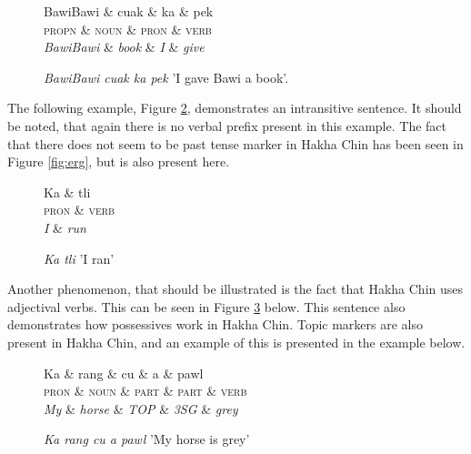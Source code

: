 \documentclass[10pt, a4paper]{article}
\begin{document}
\begin{figure}[h]
\centering
 \begin{dependency} 
   \begin{deptext}[column sep=0.2cm]
     BawiBawi \& cuak \& ka \& pek\\
     \textsc{propn} \& \textsc{noun} \& \textsc{pron} \& \textsc{verb}\\
     \emph{BawiBawi} \& \emph{book} \& \emph{I} \& \emph{give} \\
     \end{deptext}
 \end{dependency}
\caption{\label{fig:ditrans}}\emph{BawiBawi cuak ka pek} 'I gave Bawi a book'.
\end{figure}

The following example, Figure \ref{fig:intrans}, demonstrates an intransitive sentence. It should be noted, that again there is no verbal prefix present in this example. The fact that there does not seem to be past tense marker in Hakha Chin has been seen in Figure \ref{fig:erg}, but is also present here. 

\begin{figure}[h]
\centering
 \begin{dependency} 
   \begin{deptext}[column sep=0.4cm]
     Ka \& tli\\
     \textsc{pron} \& \textsc{verb}\\
     \emph{I} \& \emph{run} \\
     \end{deptext}
 \end{dependency}
\caption{\label{fig:intrans}}\emph{Ka tli} 'I ran' 
\end{figure}

Another phenomenon, that should be illustrated is the fact that Hakha Chin uses adjectival verbs. This can be seen in Figure \ref{fig:adjverb} below. This sentence also demonstrates how possessives work in Hakha Chin. Topic markers are also present in Hakha Chin, and an example of this is presented in the example below.

\begin{figure}[h]
\centering
 \begin{dependency} 
   \begin{deptext}[column sep=0.2cm]
     Ka \& rang \& cu \& a \& pawl\\
     \textsc{pron} \& \textsc{noun} \& \textsc{part} \& \textsc{part} \& \textsc{verb}\\
     \emph{My} \& \emph{horse} \& \emph{TOP} \& \emph{3SG} \& \emph{grey}\\
     \end{deptext}
 \end{dependency}
\caption{\label{fig:adjverb}}\emph{Ka rang cu a pawl} 'My horse is grey' 
\end{figure}
\end{document}
